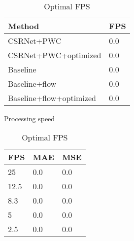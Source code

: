 \begin{table}[]
\begin{minipage}{.5\linewidth}
\centering
\begin{tabular}{ll}
\hline
Method                             & FPS \\ \hline
\multicolumn{1}{l|}{CSRNet+PWC}    & 0.0 \\
\multicolumn{1}{l|}{CSRNet+PWC+optimized}& 0.0 \\
\multicolumn{1}{l|}{Baseline}      & 0.0 \\
\multicolumn{1}{l|}{Baseline+flow} & 0.0 \\
\multicolumn{1}{l|}{Baseline+flow+optimized} & 0.0 \\ \hline
\end{tabular}
\caption{\label{tab:fps_fudan}Processing speed}
\end{minipage} %
\begin{minipage}{.5\linewidth}
\centering
\begin{tabular}{lll}
		\hline
		FPS                               & MAE & MSE \\ \hline
		\multicolumn{1}{l|}{25}          & 0.0 & 0.0 \\
		\multicolumn{1}{l|}{12.5}        & 0.0 & 0.0 \\
		\multicolumn{1}{l|}{8.3}        & 0.0 & 0.0 \\
		\multicolumn{1}{l|}{5}        & 0.0 & 0.0 \\
		\multicolumn{1}{l|}{2.5} & 0.0 & 0.0 \\ \hline
		\end{tabular}
\caption{\label{tab:fps_fudan} Optimal FPS}
\end{minipage}
\end{table}

